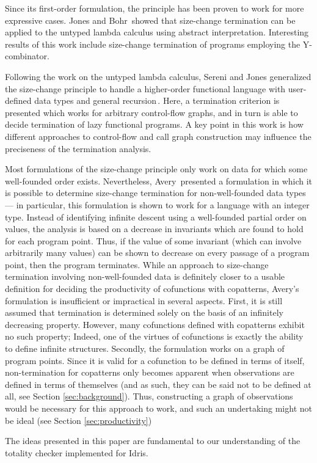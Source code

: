 Since its first-order formulation, the principle has been proven to work for more expressive cases. Jones and Bohr\,\citep{Jones04Untyped} showed that size-change termination can be applied to the untyped lambda calculus using abstract interpretation. Interesting results of this work include size-change termination of programs employing the Y-combinator.

Following the work on the untyped lambda calculus, Sereni and Jones generalized the size-change principle to handle a higher-order functional language with user-defined data types and general recursion\,\citep{Sereni05terminationanalysis,Sereni06Phd}. Here, a termination criterion is presented which works for arbitrary control-flow graphs, and in turn is able to decide termination of lazy functional programs. A key point in this work is how different approaches to control-flow and call graph construction may influence the preciseness of the termination analysis.

Most formulations of the size-change principle only work on data for which some well-founded order exists. Nevertheless, Avery\,\citep{Avery06} presented a formulation in which it is possible to determine size-change termination for non-well-founded data types --- in particular, this formulation is shown to work for a language with an integer type. Instead of identifying infinite descent using a well-founded partial order on values, the analysis is based on a decrease in invariants which are found to hold for each program point. Thus, if the value of some invariant (which can involve arbitrarily many values) can be shown to decrease on every passage of a program point, then the program terminates. While an approach to size-change termination involving non-well-founded data is definitely closer to a usable definition for deciding the productivity of cofunctions with copatterns, Avery's formulation is insufficient or impractical in several aspects. First, it is still assumed that termination is determined solely on the basis of an infinitely decreasing property. However, many cofunctions defined with copatterns exhibit no such property; Indeed, one of the virtues of cofunctions is exactly the ability to define infinite structures. Secondly, the formulation works on a graph of program points. Since it is valid for a cofunction to be defined in terms of itself, non-termination for copatterns only becomes apparent when observations are defined in terms of themselves (and as such, they can be said not to be defined at all, see Section \ref{sec:background}). Thus, constructing a graph of observations would be necessary for this approach to work, and such an undertaking might not be ideal (see Section \ref{sec:productivity})


The ideas presented in this paper are fundamental to our understanding of the totality checker implemented for Idris. 